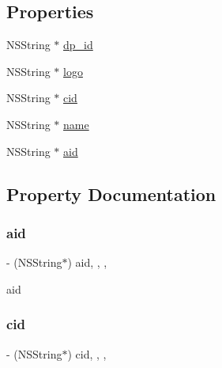 \subsection*{Properties}
\begin{DoxyCompactItemize}
\item 
N\+S\+String $\ast$ \mbox{\hyperlink{interface_j_m_brand_list_model_a3679d3181c1f30527500381bad1a9cb4}{dp\+\_\+id}}
\item 
N\+S\+String $\ast$ \mbox{\hyperlink{interface_j_m_brand_list_model_ac2fc03e02a58ddb0250b5b01f9609726}{logo}}
\item 
N\+S\+String $\ast$ \mbox{\hyperlink{interface_j_m_brand_list_model_a6dfa5c6ad1153cab3e07c91b83823e0f}{cid}}
\item 
N\+S\+String $\ast$ \mbox{\hyperlink{interface_j_m_brand_list_model_a7c12b3e28e8b007b1b2b6877aa802220}{name}}
\item 
N\+S\+String $\ast$ \mbox{\hyperlink{interface_j_m_brand_list_model_aea0c4fe82eaa5ed50b3c0c501675c51b}{aid}}
\end{DoxyCompactItemize}


\subsection{Property Documentation}
\mbox{\label{interface_j_m_brand_list_model_aea0c4fe82eaa5ed50b3c0c501675c51b}} 
\subsubsection{\texorpdfstring{aid}{aid}}
{\footnotesize\ttfamily -\/ (N\+S\+String$\ast$) aid\hspace{0.3cm}{\ttfamily [read]}, {\ttfamily [write]}, {\ttfamily [nonatomic]}, {\ttfamily [copy]}}

aid \mbox{\label{interface_j_m_brand_list_model_a6dfa5c6ad1153cab3e07c91b83823e0f}} 
\subsubsection{\texorpdfstring{cid}{cid}}
{\footnotesize\ttfamily -\/ (N\+S\+String$\ast$) cid\hspace{0.3cm}{\ttfamily [read]}, {\ttfamily [write]}, {\ttfamily [nonatomic]}, {\ttfamily [copy]}}

